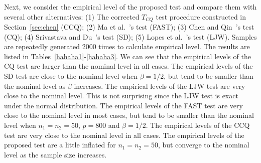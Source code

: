 \documentclass[times,sort&compress,3p]{elsarticle}
\theoremstyle{plain}
\theoremstyle{definition}
\theoremstyle{remark}
\begin{document}
Next, we consider the empirical level of the proposed test and compare them with several other alternatives: (1) The corrected $T_{CQ}$ test procedure constructed in Section~\ref{sec:chen} (CCQ); (2) Ma {et al.}~\cite{Ma2015A}'s test (FAST); (3) Chen and Qin~\cite{Chen2010A}'s test (CQ); (4) Srivastava and Du~\cite{Srivastava2008A}'s test (SD); (5) Lopes {\rm et al.}~\cite{Lopes2015A}'s test (LJW).
Samples are repeatedly generated $2000$ times to calculate empirical level.
The results are listed in Tables~\ref{hahaha1}-\ref{hahaha3}.
We can see that the empirical levels of the CQ test are larger than the nominal level in all cases.
The empirical levels of the SD test are close to the nominal level when $\beta=1/2$, but tend to be smaller than the nominal level as $\beta$ increases.
 The empirical levels of the LJW test are very close to the nominal level.
 This is not surprising since the LJW test is exact under the normal distribution.
The empirical levels of the FAST test are very close to the nominal level in most cases, but tend to be smaller than the nominal level when $n_1=n_2=50$, $p=800$ and $\beta=1/2$.
The empirical levels of the CCQ test are very close to the nominal level in all cases.
The empirical levels of the proposed test are a little inflated for $n_1=n_2=50$, but converge to the nominal level as the sample size increases.
\end{document}
